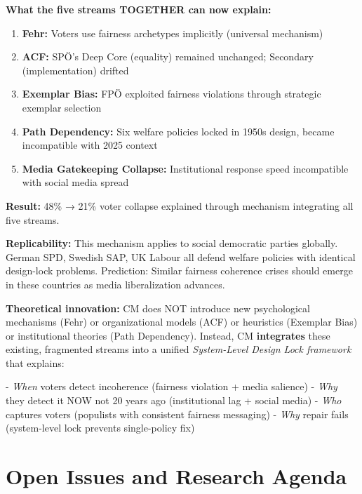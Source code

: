 \begin{tcolorbox}[colback=yellow!5!white, colframe=yellow!75!black,
    title=Integration Achievement: Explaining Austrian SPÖ Collapse]

\textbf{What the five streams TOGETHER can now explain:}

\begin{enumerate}[nosep]
\item \textbf{Fehr:} Voters use fairness archetypes implicitly (universal mechanism)
\item \textbf{ACF:} SPÖ's Deep Core (equality) remained unchanged; Secondary (implementation) drifted
\item \textbf{Exemplar Bias:} FPÖ exploited fairness violations through strategic exemplar selection
\item \textbf{Path Dependency:} Six welfare policies locked in 1950s design, became incompatible with 2025 context
\item \textbf{Media Gatekeeping Collapse:} Institutional response speed incompatible with social media spread
\end{enumerate}

\textbf{Result:} 48\% → 21\% voter collapse explained through mechanism integrating all five streams.

\textbf{Replicability:} This mechanism applies to social democratic parties globally. German SPD, Swedish SAP,
UK Labour all defend welfare policies with identical design-lock problems. Prediction: Similar fairness
coherence crises should emerge in these countries as media liberalization advances.

\textbf{Theoretical innovation:} CM does NOT introduce new psychological mechanisms (Fehr) or organizational
models (ACF) or heuristics (Exemplar Bias) or institutional theories (Path Dependency). Instead, CM
\textbf{integrates} these existing, fragmented streams into a unified \textit{System-Level Design Lock
framework} that explains:

- \textit{When} voters detect incoherence (fairness violation + media salience)
- \textit{Why} they detect it NOW not 20 years ago (institutional lag + social media)
- \textit{Who} captures voters (populists with consistent fairness messaging)
- \textit{Why} repair fails (system-level lock prevents single-policy fix)

\end{tcolorbox}

\section{Open Issues and Research Agenda}
\label{sec:cm-open}

